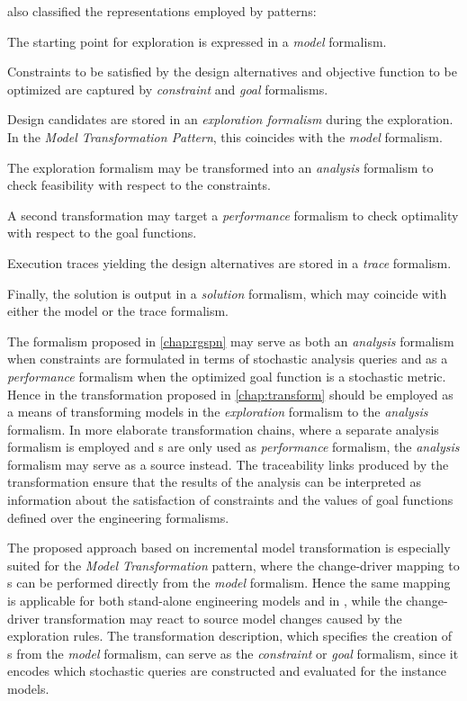 \citet{Vanherpen14patterns} also classified the representations employed by  patterns:
\begin{enumerate*}
\item The starting point for exploration is expressed in a \emph{model} formalism.
\item Constraints to be satisfied by the design alternatives and objective function to be optimized are captured by \emph{constraint} and \emph{goal} formalisms.
\item Design candidates are stored in an \emph{exploration formalism} during the exploration. In the \emph{Model Transformation Pattern}, this coincides with the \emph{model} formalism.
\item The exploration formalism may be transformed into an \emph{analysis} formalism to check feasibility with respect to the constraints.
\item A second transformation may target a \emph{performance} formalism to check optimality with respect to the goal functions.
\item Execution traces yielding the design alternatives are stored in a \emph{trace} formalism.
\item Finally, the solution is output in a \emph{solution} formalism, which may coincide with either the model or the trace formalism.
\end{enumerate*}

The  formalism proposed in \cref{chap:rgspn} may serve as both an \emph{analysis} formalism when constraints are formulated in terms of stochastic analysis queries and as a \emph{performance} formalism when the optimized goal function is a stochastic metric. Hence in  the transformation proposed in \cref{chap:transform} should be employed as a means of transforming models in the \emph{exploration} formalism to the \emph{analysis} formalism. In more elaborate transformation chains, where a separate analysis formalism is employed and s are only used as \emph{performance} formalism, the \emph{analysis} formalism may serve as a source instead. The traceability links produced by the transformation ensure that the results of the analysis can be interpreted as information about the satisfaction of constraints and the values of goal functions defined over the engineering formalisms.

The proposed approach based on incremental model transformation is especially suited for the \emph{Model Transformation}  pattern, where the change-driver mapping to s can be performed directly from the \emph{model} formalism. Hence the same mapping is applicable for both stand-alone engineering models and in , while the change-driver transformation may react to source model changes caused by the exploration rules. The transformation description, which specifies the creation of s from the \emph{model} formalism, can serve as the \emph{constraint} or \emph{goal} formalism, since it encodes which stochastic queries are constructed and evaluated for the instance models.

